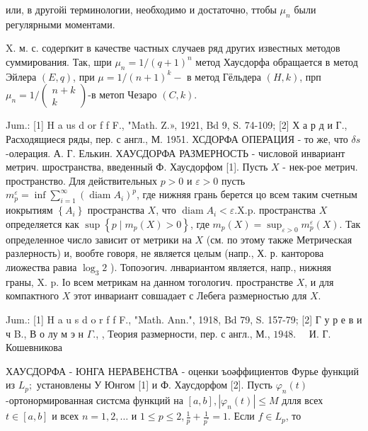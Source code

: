\documentclass[10pt]{article}
\begin{document}
или, в другойі терминологии, необходимо и достаточно, ттобы $\mu_{n}$ были регулярными моментами.



X. м. с. содерґкит в качестве частных случаев ряд других известных методов суммирования. Так, шри $\mu_{n}=1 /(q+1)^{n}$ метод Хаусдорфа обращается в метод Эйлера $(E, q)$, при $\mu=1 /(n+1)^{k}-$ в метод Гёльдера $(H, k)$, прп $\mu_{n}=1 /\left(\begin{array}{c}n+k \\ k\end{array}\right)$-в метоп Чезаро $(C, k)$.



Jum.: [1] H a us d or f f F., "Math. Z.», 1921, Bd 9, S. 74-109; [2] Х а р д и Г., Расходящиеся ряды, пер. с англ., М. 1951. ХСДОРФА ОПЕРАЦИЯ - то же, что $\delta s$-олерация. А. Г. Елькин. ХАУСДОРФА РАЗМЕРНОСТЬ - числовой инвариант метрич. шространства, введенный Ф. Хаусдорфом [1]. Пусть $X$ - нек-рое метрич. пространство. Для действительных $p>0$ и $\varepsilon>0$ пусть $m_{p}^{\varepsilon}=\inf \sum_{i=1}^{\infty}\left(\operatorname{diam} A_{i}\right)^{p}$, где нижняя грань берется цо всем таким счетным иокрытиям $\left\{A_{i}\right\}$ пространства $X$, что $\operatorname{diam} A_{i}<\varepsilon . \mathrm{X} . \mathrm{p}$. пространства $X$ определяется как $\sup \left\{p \mid m_{p}(X)>0\right\}$, где $m_{p}(X)=\sup _{\varepsilon>0} m_{p}^{\varepsilon}(X)$. Так определенное число зависит от метрики на $X$ (см. по этому также Метрическая разлерность) и, вообте говоря, не является целым (напр., Х. р. канторова лиожества равиа $\log _{3} 2$ ). Топоэогич. лнвариантом является, напр., нижняя граны, X. p. Іо всем метрикам на данном тогологич. пространстве $X$, и для компактного $X$ этот инвариант совшадает с Лебега размерностью для $X$.



Jum.: [1] H a u s d o r f f F., "Math. Ann.", 1918, Bd 79, S. 157-79; [2] Г у р е в и ч B., В о лу м э н $\Gamma .$, , Теория размерности, пер. с англ., М., $1948 . \quad$ И. Г. Кошевникова



ХАУСДОРФА - ЮНГА НЕРАВЕНСТВА - оценки ъоәффициентов Фурье функций из $L_{p} ;$ установлены У Юнгом [1] и Ф. Хаусдорфом [2]. Пусть $\varphi_{n}(t)$-ортонормированная систсма функций на $[a, b],\left|\varphi_{n}(t)\right| \leqslant M$ длля всех $t \in[a, b]$ и всех $n=1,2, \ldots$ и $1 \leqslant p \leqslant 2, \frac{1}{p}+\frac{1}{p^{\prime}}=1$. Если $f \in L_{p}$, то
\end{document}
